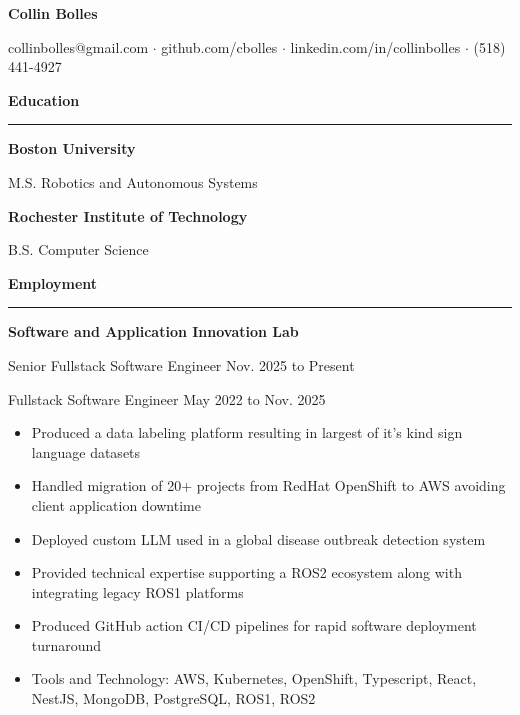 \documentclass{article}
\newcommand{\rSection}[1] {
  \smallskip
  {\large\bfseries #1} \\
  \rule{\linewidth}{0.4pt}
}
\newcommand{\rSubSubSection}[1] {
  \textbf{#1}
}
\begin{document}
\pagestyle{empty}

{\LARGE\bfseries Collin Bolles} \par
\medskip
collinbolles@gmail.com $\cdot$ github.com/cbolles $\cdot$ linkedin.com/in/collinbolles $\cdot$ (518) 441-4927 \par

\rSection{Education} \par
\vspace{-15pt}
\rSubSubSection{Boston University} \par
M.S. Robotics and Autonomous Systems \par

\rSubSubSection{Rochester Institute of Technology} \par
B.S. Computer Science \par

\rSection{Employment} \par
\vspace{-15pt}

\rSubSubSection{Software and Application Innovation Lab}\par
Senior Fullstack Software Engineer \hfill Nov. 2025 to Present \par
Fullstack Software Engineer \hfill May 2022 to Nov. 2025 \par

\begin{itemize}[leftmargin=*]
  \item Produced a data labeling platform resulting in largest of it's kind sign language datasets
  \item Handled migration of 20+ projects from RedHat OpenShift to AWS avoiding client application downtime
  \item Deployed custom LLM used in a global disease outbreak detection system
  \item Provided technical expertise supporting a ROS2 ecosystem along with integrating legacy ROS1 platforms
  \item Produced GitHub action CI/CD pipelines for rapid software deployment turnaround
  \item Tools and Technology: AWS, Kubernetes, OpenShift, Typescript, React, NestJS, MongoDB, PostgreSQL, ROS1, ROS2
\end{itemize}
\end{document}
